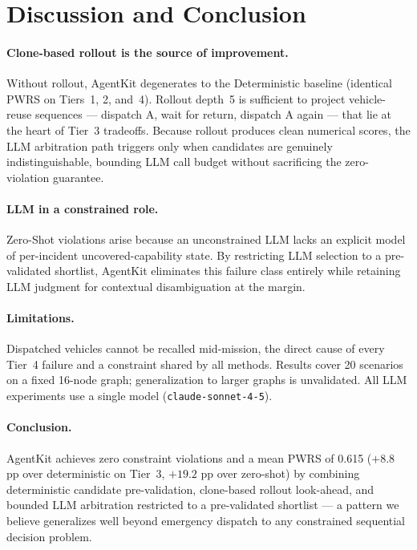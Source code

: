 \documentclass{article}
\begin{document}
\section{Discussion and Conclusion}
\label{sec:conclusion}

\paragraph{Clone-based rollout is the source of improvement.}
Without rollout, AgentKit degenerates to the Deterministic baseline
(identical PWRS on Tiers~1, 2, and~4).
Rollout depth~5 is sufficient to project vehicle-reuse sequences ---
dispatch A, wait for return, dispatch A again --- that lie at the heart
of Tier~3 tradeoffs.
Because rollout produces clean numerical scores, the LLM arbitration
path triggers only when candidates are genuinely indistinguishable,
bounding LLM call budget without sacrificing the zero-violation guarantee.

\paragraph{LLM in a constrained role.}
Zero-Shot violations arise because an unconstrained LLM lacks an explicit
model of per-incident uncovered-capability state.
By restricting LLM selection to a pre-validated shortlist, AgentKit
eliminates this failure class entirely while retaining LLM judgment for
contextual disambiguation at the margin.

\paragraph{Limitations.}
Dispatched vehicles cannot be recalled mid-mission, the direct cause of
every Tier~4 failure and a constraint shared by all methods.
Results cover 20 scenarios on a fixed 16-node graph; generalization to
larger graphs is unvalidated.
All LLM experiments use a single model (\texttt{claude-sonnet-4-5}).

\paragraph{Conclusion.}
AgentKit achieves zero constraint violations and a mean PWRS of 0.615
($+8.8$ pp over deterministic on Tier~3, $+19.2$ pp over zero-shot)
by combining deterministic candidate pre-validation, clone-based rollout
look-ahead, and bounded LLM arbitration restricted to a pre-validated
shortlist --- a pattern we believe generalizes well beyond emergency
dispatch to any constrained sequential decision problem.
\end{document}
